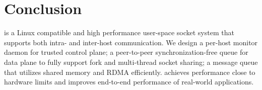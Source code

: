 \section{Conclusion}
\label{sec:conclusion}

\sys{} is a Linux compatible and high performance user-space socket system that supports both intra- and inter-host communication.
We design a per-host monitor daemon for trusted control plane;
a peer-to-peer synchronization-free queue for data plane to fully support fork and multi-thread socket sharing;
a message queue that utilizes shared memory and RDMA efficiently.
\sys{} achieves performance close to hardware limits and improves end-to-end performance of real-world applications.

